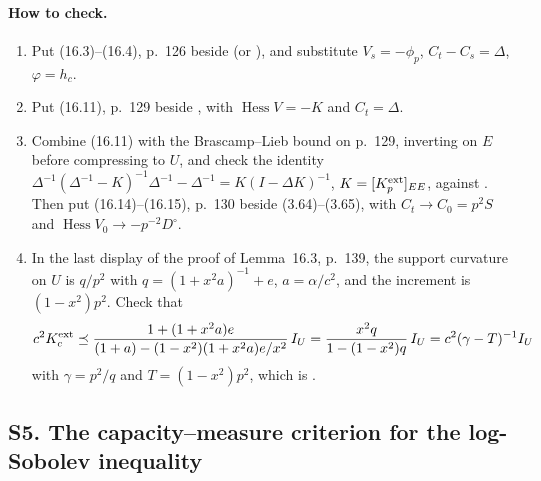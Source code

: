 \documentclass[11pt]{article}
\newcommand{\ploc}[2]{#1}
\newcommand{\sloc}[2]{\cite[#2]{#1}}
\begin{document}
\paragraph{How to check.}
\begin{enumerate}
\item Put \ploc{(16.3)--(16.4), p.~126}{cap-multiscale.tex:154--163} beside
\sloc{BauerschmidtBodineauDagallier2023-PolchinskiIntroduction}{Def.~3.2, (3.11)--(3.12), p.~16; (3.17), p.~17; proof of Lemma~3.11, p.~22}
(or \sloc{BauerschmidtBodineau2019-SineGordonMultiscaleBakryEmery}{(1.3)--(1.4), p.~2}),
and substitute $V_s=-\phi_p$, $C_t-C_s=\Delta$, $\varphi=h_c$.
\item Put \ploc{(16.11), p.~129}{cap-multiscale.tex:388--395} beside
\sloc{BauerschmidtBodineauDagallier2023-PolchinskiIntroduction}{Lemma~3.12, (3.61), second equality, p.~23},
with $\operatorname{Hess}V=-K$ and $C_t=\Delta$.
\item Combine (16.11) with the Brascamp--Lieb bound
\ploc{on p.~129}{cap-multiscale.tex:405--407}, inverting on $E$ before
compressing to $U$, and check the identity
$\Delta^{-1}(\Delta^{-1}-K)^{-1}\Delta^{-1}-\Delta^{-1}=K(I-\Delta K)^{-1}$,
$K=[K_p^{\rm ext}]_{EE}$, against \sloc{BauerschmidtBodineauDagallier2023-PolchinskiIntroduction}{(3.64), p.~23}.
Then put \ploc{(16.14)--(16.15), p.~130}{cap-multiscale.tex:454--504} beside
(3.64)--(3.65), with $C_t\to C_0=p^2S$ and
$\operatorname{Hess}V_0\to-p^{-2}D^\circ$.
\item In the last display of the
\ploc{proof of Lemma~16.3, p.~139}{cap-multiscale.tex:1188--1205}, the support
curvature on $U$ is $q/p^2$ with $q=(1+x^2a)^{-1}+e$, $a=\alpha/c^2$, and the
increment is $(1-x^2)p^2$. Check that
\[
 c^2K^{\rm ext}_c\preceq\frac{1+(1+x^2a)e}{(1+a)-(1-x^2)(1+x^2a)e/x^2}\,I_U
 =\frac{x^2q}{1-(1-x^2)q}\,I_U=c^2(\gamma-T)^{-1}I_U
\]
with $\gamma=p^2/q$ and $T=(1-x^2)p^2$, which is
\sloc{AnariKoehlerVuong2024-TrickleDownLocalizationSchemes}{Thm.~102, p.~76}.
\end{enumerate}

\subsection{S5. The capacity--measure criterion for the log-Sobolev inequality}\label{f:S5}
\end{document}
